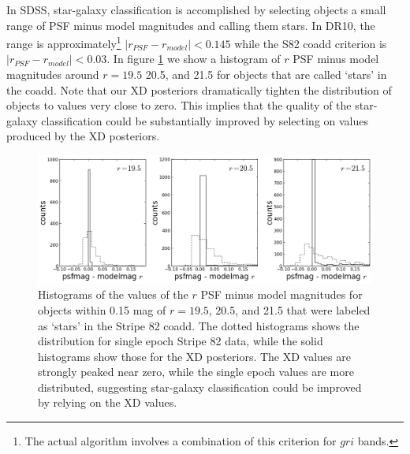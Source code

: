 \documentclass[12pt,preprint]{aastex}
\begin{document}
In SDSS, star-galaxy classification is accomplished by selecting objects a
small range of PSF minus model magnitudes and calling them stars.  In DR10,
the range is approximately\footnote{The actual algorithm involves a combination
of this criterion for $gri$ bands.} $|r_{PSF} - r_{model}| < 0.145$ while the
S82 coadd criterion is $|r_{PSF} - r_{model}| < 0.03$.  In figure \ref{fig:pmm}
we show a histogram of $r$ PSF minus model magnitudes around $r=19.5$
20.5, and 21.5 for objects that are called `stars' in the coadd.  Note that
our XD posteriors dramatically tighten the distribution of objects to values
very close to zero.  This implies that the quality of the star-galaxy
classification could be substantially improved by selecting on values produced
by the XD posteriors.

\begin{figure}
\centering
\includegraphics[width=16cm]{fig6.png}
\caption{Histograms of the values of the $r$ PSF minus model magnitudes for 
objects within 0.15 mag of $r = 19.5$, 20.5, and 21.5 that were labeled as 
`stars' in the Stripe 82 coadd.  The dotted histograms shows the distribution
for single epoch Stripe 82 data, while the solid histograms show those for the
XD posteriors.  The XD values are strongly peaked near zero, while the single
epoch values are more distributed, suggesting star-galaxy classification
could be improved by relying on the XD values.  
}
\label{fig:pmm}
\end{figure}
\end{document}
